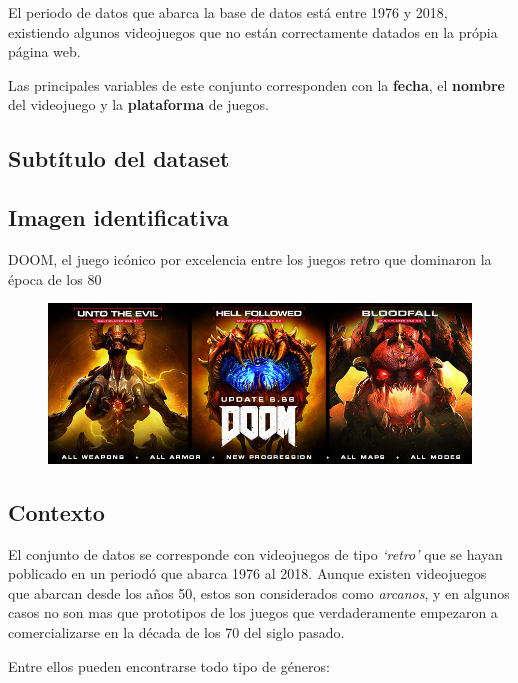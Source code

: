 \documentclass[]{article}
\begin{document}
El periodo de datos que abarca la base de datos está entre 1976 y 2018,
existiendo algunos videojuegos que no están correctamente datados en la
própia página web.

Las principales variables de este conjunto corresponden con la
\textbf{fecha}, el \textbf{nombre} del videojuego y la
\textbf{plataforma} de juegos.

\subsection{Subtítulo del dataset}\label{subtitulo-del-dataset}

\subsection{Imagen identificativa}\label{imagen-identificativa}

DOOM, el juego icónico por excelencia entre los juegos retro que
dominaron la época de los 80

\begin{figure}[h!]
\centering
\includegraphics{DOOM_6.66update.jpg}
\end{figure}

\subsection{Contexto}\label{contexto}

El conjunto de datos se corresponde con videojuegos de tipo
\emph{`retro'} que se hayan poblicado en un periodó que abarca 1976 al
2018. Aunque existen videojuegos que abarcan desde los años 50, estos
son considerados como \emph{arcanos}, y en algunos casos no son mas que
prototipos de los juegos que verdaderamente empezaron a comercializarse
en la década de los 70 del siglo pasado.

Entre ellos pueden encontrarse todo tipo de géneros:
\end{document}
